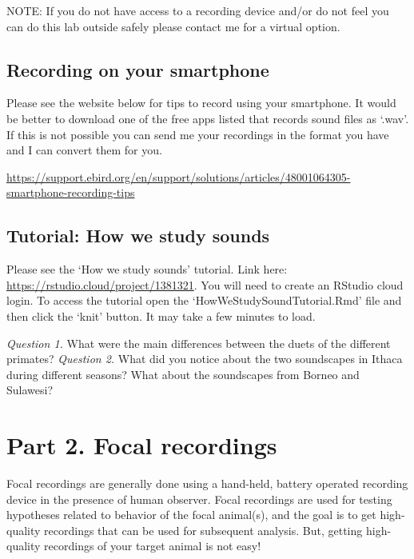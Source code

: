 \documentclass[]{book}
\begin{document}
NOTE: If you do not have access to a recording device and/or do not feel you can do this lab outside safely please contact me for a virtual option.

\hypertarget{recording-on-your-smartphone}{%
\subsection*{Recording on your smartphone}\label{recording-on-your-smartphone}}

Please see the website below for tips to record using your smartphone. It would be better to download one of the free apps listed that records sound files as `.wav'. If this is not possible you can send me your recordings in the format you have and I can convert them for you.

\url{https://support.ebird.org/en/support/solutions/articles/48001064305-smartphone-recording-tips}

\hypertarget{tutorial-how-we-study-sounds}{%
\subsection*{Tutorial: How we study sounds}\label{tutorial-how-we-study-sounds}}

Please see the `How we study sounds' tutorial. Link here: \url{https://rstudio.cloud/project/1381321}. You will need to create an RStudio cloud login. To access the tutorial open the `HowWeStudySoundTutorial.Rmd' file and then click the `knit' button. It may take a few minutes to load.

\emph{Question 1.} What were the main differences between the duets of the different primates?
\emph{Question 2.} What did you notice about the two soundscapes in Ithaca during different seasons? What about the soundscapes from Borneo and Sulawesi?

\hypertarget{part-2.-focal-recordings}{%
\section*{Part 2. Focal recordings}\label{part-2.-focal-recordings}}

Focal recordings are generally done using a hand-held, battery operated recording device in the presence of human observer. Focal recordings are used for testing hypotheses related to behavior of the focal animal(s), and the goal is to get high-quality recordings that can be used for subsequent analysis. But, getting high-quality recordings of your target animal is not easy!
\end{document}
